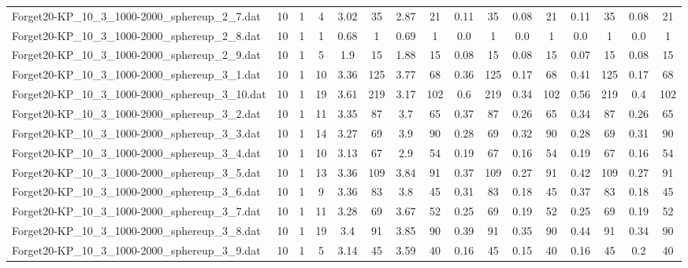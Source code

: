 \begin{sidewaystable}[!ht]
{\begin{tabular}{lccccccccccccccc}
Forget20-KP\_10\_3\_1000-2000\_sphereup\_2\_7.dat & 10 & 1 & 4 & 3.02 & 35 & 2.87 & 21 & 0.11 & 35 &  \textcolor{blue2}{0.08} & 21 & 0.11 & 35 &  \textcolor{blue2}{0.08} & 21 \\
Forget20-KP\_10\_3\_1000-2000\_sphereup\_2\_8.dat & 10 & 1 & 1 & 0.68 & 1 & 0.69 & 1 &  \textcolor{blue2}{0.0} & 1 &  \textcolor{blue2}{0.0} & 1 &  \textcolor{blue2}{0.0} & 1 &  \textcolor{blue2}{0.0} & 1 \\
Forget20-KP\_10\_3\_1000-2000\_sphereup\_2\_9.dat & 10 & 1 & 5 & 1.9 & 15 & 1.88 & 15 & 0.08 & 15 & 0.08 & 15 &  \textcolor{blue2}{0.07} & 15 & 0.08 & 15 \\
Forget20-KP\_10\_3\_1000-2000\_sphereup\_3\_1.dat & 10 & 1 & 10 & 3.36 & 125 & 3.77 & 68 & 0.36 & 125 &  \textcolor{blue2}{0.17} & 68 & 0.41 & 125 &  \textcolor{blue2}{0.17} & 68 \\
Forget20-KP\_10\_3\_1000-2000\_sphereup\_3\_10.dat & 10 & 1 & 19 & 3.61 & 219 & 3.17 & 102 & 0.6 & 219 &  \textcolor{blue2}{0.34} & 102 & 0.56 & 219 & 0.4 & 102 \\
Forget20-KP\_10\_3\_1000-2000\_sphereup\_3\_2.dat & 10 & 1 & 11 & 3.35 & 87 & 3.7 & 65 & 0.37 & 87 &  \textcolor{blue2}{0.26} & 65 & 0.34 & 87 &  \textcolor{blue2}{0.26} & 65 \\
Forget20-KP\_10\_3\_1000-2000\_sphereup\_3\_3.dat & 10 & 1 & 14 & 3.27 & 69 & 3.9 & 90 &  \textcolor{blue2}{0.28} & 69 & 0.32 & 90 &  \textcolor{blue2}{0.28} & 69 & 0.31 & 90 \\
Forget20-KP\_10\_3\_1000-2000\_sphereup\_3\_4.dat & 10 & 1 & 10 & 3.13 & 67 & 2.9 & 54 & 0.19 & 67 &  \textcolor{blue2}{0.16} & 54 & 0.19 & 67 &  \textcolor{blue2}{0.16} & 54 \\
Forget20-KP\_10\_3\_1000-2000\_sphereup\_3\_5.dat & 10 & 1 & 13 & 3.36 & 109 & 3.84 & 91 & 0.37 & 109 &  \textcolor{blue2}{0.27} & 91 & 0.42 & 109 &  \textcolor{blue2}{0.27} & 91 \\
Forget20-KP\_10\_3\_1000-2000\_sphereup\_3\_6.dat & 10 & 1 & 9 & 3.36 & 83 & 3.8 & 45 & 0.31 & 83 &  \textcolor{blue2}{0.18} & 45 & 0.37 & 83 &  \textcolor{blue2}{0.18} & 45 \\
Forget20-KP\_10\_3\_1000-2000\_sphereup\_3\_7.dat & 10 & 1 & 11 & 3.28 & 69 & 3.67 & 52 & 0.25 & 69 &  \textcolor{blue2}{0.19} & 52 & 0.25 & 69 &  \textcolor{blue2}{0.19} & 52 \\
Forget20-KP\_10\_3\_1000-2000\_sphereup\_3\_8.dat & 10 & 1 & 19 & 3.4 & 91 & 3.85 & 90 & 0.39 & 91 & 0.35 & 90 & 0.44 & 91 &  \textcolor{blue2}{0.34} & 90 \\
Forget20-KP\_10\_3\_1000-2000\_sphereup\_3\_9.dat & 10 & 1 & 5 & 3.14 & 45 & 3.59 & 40 & 0.16 & 45 &  \textcolor{blue2}{0.15} & 40 & 0.16 & 45 & 0.2 & 40 \\

\end{tabular}}
\end{sidewaystable}
